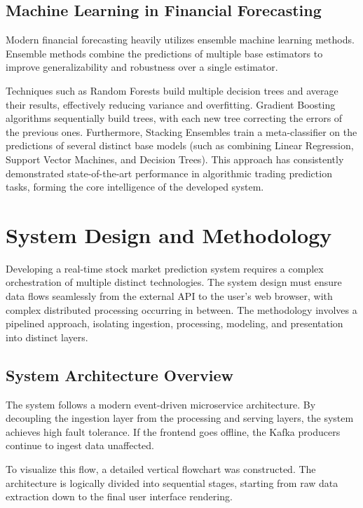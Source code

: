 \documentclass[12pt,a4paper]{report}
\begin{document}
\subsection{Machine Learning in Financial Forecasting}

Modern financial forecasting heavily utilizes ensemble machine learning methods. Ensemble methods combine the predictions of multiple base estimators to improve generalizability and robustness over a single estimator. 

Techniques such as Random Forests build multiple decision trees and average their results, effectively reducing variance and overfitting. Gradient Boosting algorithms sequentially build trees, with each new tree correcting the errors of the previous ones. Furthermore, Stacking Ensembles train a meta-classifier on the predictions of several distinct base models (such as combining Linear Regression, Support Vector Machines, and Decision Trees). This approach has consistently demonstrated state-of-the-art performance in algorithmic trading prediction tasks, forming the core intelligence of the developed system.

\clearpage

\section{System Design and Methodology}

Developing a real-time stock market prediction system requires a complex orchestration of multiple distinct technologies. The system design must ensure data flows seamlessly from the external API to the user's web browser, with complex distributed processing occurring in between. The methodology involves a pipelined approach, isolating ingestion, processing, modeling, and presentation into distinct layers.

\subsection{System Architecture Overview}

The system follows a modern event-driven microservice architecture. By decoupling the ingestion layer from the processing and serving layers, the system achieves high fault tolerance. If the frontend goes offline, the Kafka producers continue to ingest data unaffected. 

To visualize this flow, a detailed vertical flowchart was constructed. The architecture is logically divided into sequential stages, starting from raw data extraction down to the final user interface rendering.
\end{document}
